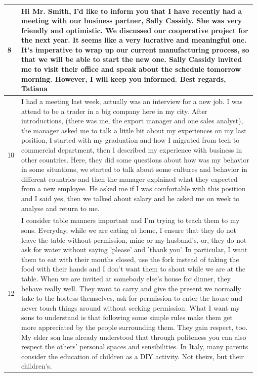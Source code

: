 \documentclass[11pt,a4paper]{article}
\begin{document}
\begin{longtable}{l|p{}}
  \midrule
  8 & Hi Mr. Smith, I'd like to inform you that I have recently had a meeting
  with our business partner, Sally Cassidy. She was very friendly and
  optimistic. We discussed our cooperative project for the next year. It seems
  like a very lucrative and meaningful one. It's imperative to wrap up our
  current manufacturing process, so that we will be able to start the new one.
  Sally Cassidy invited me to visit their office and speak about the schedule
  tomorrow morning. However, I will keep you informed. Best regards, Tatiana\\
  \midrule
  10 & I had a meeting last week, actually was an interview for a new job. I
  was attend to be a trader in a big company here in my city. After
  introductions, (there was me, the export manager and one sales analyst), the
  manager asked me to talk a little bit about my experiences on my last
  position, I started with my graduation and how I migrated from tech to
  commercial department, then I described my experience with business in other
  countries. Here, they did some questions about how was my behavior in some
  situations, we started to talk about some cultures and behavior in different
  countries and then the manager explained what they expected from a new
  employee. He asked me if I was comfortable with this position and I said yes,
  then we talked about salary and he asked me on week to analyse and return to
  me.\\
  \midrule
  12 & I consider table manners important and I'm trying to teach them to my
  sons. Everyday, while we are eating at home, I ensure that they do not leave
  the table without permission, mine or my husband's, or, they do not ask for
  water without saying 'please' and 'thank you'. In particular, I want them to
  eat with their mouths closed, use the fork instead of taking the food with
  their hands and I don't want them to shout while we are at the table. When we
  are invited at somebody else's house for dinner, they behave really well.
  They want to carry and give the present we normally take to the hostess
  themselves, ask for permission to enter the house and never touch things
  around without seeking permission. What I want my sons to understand is that
  following some simple rules make them get more appreciated by the people
  surrounding them. They gain respect, too. My elder son has already understood
  that through politeness you can also respect the others' personal spaces and
  sensibilities. In Italy, many parents consider the education of children as a
  DIY activity. Not theirs, but their children's.\\

\end{longtable}
\end{document}
